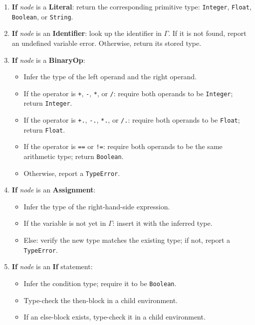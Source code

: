 \begin{enumerate}[leftmargin=1.5em, label=\arabic*., itemsep=2pt]
  \item \textbf{If} \textit{node} is a \textbf{Literal}:\quad
        return the corresponding primitive type:
        \texttt{Integer}, \texttt{Float}, \texttt{Boolean}, or \texttt{String}.

  \item \textbf{If} \textit{node} is an \textbf{Identifier}:\quad
        look up the identifier in $\Gamma$.
        If it is not found, report an undefined variable error.
        Otherwise, return its stored type.

  \item \textbf{If} \textit{node} is a \textbf{BinaryOp}:
        \begin{itemize}[nosep, leftmargin=1.5em]
          \item Infer the type of the left operand and the right operand.
          \item If the operator is \texttt{+}, \texttt{-}, \texttt{*}, or \texttt{/}:\quad
                require both operands to be \texttt{Integer}; return \texttt{Integer}.
          \item If the operator is \texttt{+.}, \texttt{-.}, \texttt{*.}, or \texttt{/.}:\quad
                require both operands to be \texttt{Float}; return \texttt{Float}.
          \item If the operator is \texttt{==} or \texttt{!=}:\quad
                require both operands to be the same arithmetic type; return \texttt{Boolean}.
          \item Otherwise, report a \texttt{TypeError}.
        \end{itemize}

  \item \textbf{If} \textit{node} is an \textbf{Assignment}:
        \begin{itemize}[nosep, leftmargin=1.5em]
          \item Infer the type of the right-hand-side expression.
          \item If the variable is not yet in $\Gamma$: insert it with the inferred type.
          \item Else: verify the new type matches the existing type; if not, report a \texttt{TypeError}.
        \end{itemize}

  \item \textbf{If} \textit{node} is an \textbf{If} statement:
        \begin{itemize}[nosep, leftmargin=1.5em]
          \item Infer the condition type; require it to be \texttt{Boolean}.
          \item Type-check the then-block in a child environment.
          \item If an else-block exists, type-check it in a child environment.
        \end{itemize}


\end{enumerate}
